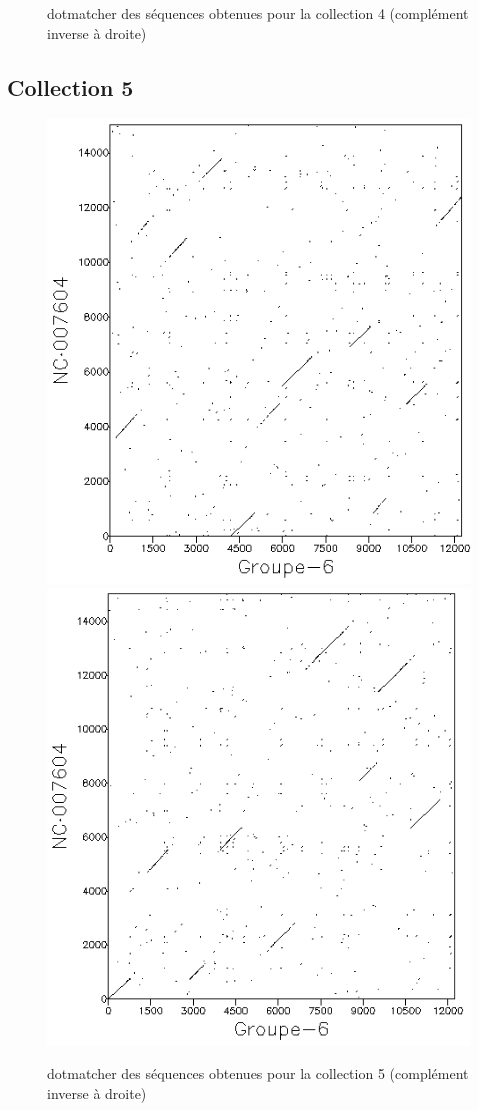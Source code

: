 \documentclass[11pt]{article}
\begin{document}
\begin{figure}[H]
\caption{dotmatcher des séquences obtenues pour la collection 4 (complément inverse à droite)}
\end{figure}
\subsection*{Collection 5}
\begin{figure}[H]
\centering
\includegraphics[scale=.55]{16320.png}
\includegraphics[scale=.55]{16320ic.png}
\caption{dotmatcher des séquences obtenues pour la collection 5 (complément inverse à droite)}
\end{figure}
\newpage
\end{document}
